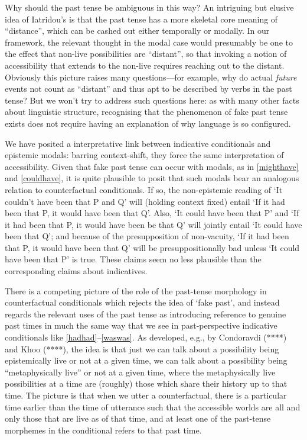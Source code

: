 \documentclass[If.tex]{subfiles}
\begin{document}
Why should the past tense be ambiguous in this way? An intriguing but elusive idea of Iatridou's is that the past tense has a more skeletal core meaning of “distance”, which can be cashed out either temporally or modally.  In our framework, the relevant thought in the modal case would presumably be one to the effect that non-live possibilities are “distant”, so that invoking a notion of accessibility that extends to the non-live requires reaching out to the distant. Obviously this picture raises many questions---for example, why do actual \emph{future} events not count as “distant” and thus apt to be described by verbs in the past tense? But we won't try to address such questions here: as with many other facts about linguistic structure, recognising that the phenomenon of fake past tense exists does not require having an explanation of why language is so configured.

We have posited a interpretative link between indicative conditionals and epistemic modals: barring context-shift, they force the same interpretation of accessibility. Given that fake past tense can occur with modals, as in \ref{mighthave} and \ref{couldhave}, it is quite plausible to posit that such modals bear an analogous relation to counterfactual conditionals. If so, the non-epistemic reading of ‘It couldn't have been that P and Q’ will (holding context fixed) entail ‘If it had been that P, it would have been that Q’. Also, ‘It could have been that P’ and ‘If it had been that P, it would have been be that Q’ will jointly entail ‘It could have been that Q’; and because of the presupposition of non-vacuity, ‘If it had been that P, it would have been that Q’ will be presuppositionally bad unless ‘It could have been that P’ is true. These claims seem no less plausible than the corresponding claims about indicatives.

There is a competing picture of the role of the past-tense morphology in counterfactual conditionals which rejects the idea of ‘fake past’, and instead regards the relevant uses of the past tense as introducing reference to genuine past times in much the same way that we see in past-perspective indicative conditionals like \ref{hadhad}--\ref{waswas}. As developed, e.g., by Condoravdi (****) and Khoo (****), the idea is that just we can talk about a possibility being epistemically live or not at a given time, we can talk about a possibility being “metaphysically live” or not at a given time, where the metaphysically live possibilities at a time are (roughly) those which share their history up to that time. The picture is that when we utter a counterfactual, there is a particular time earlier than the time of utterance such that the accessible worlds are all and only those that are live as of that time, and at least one of the past-tense morphemes in the conditional refers to that past time.
\end{document}
